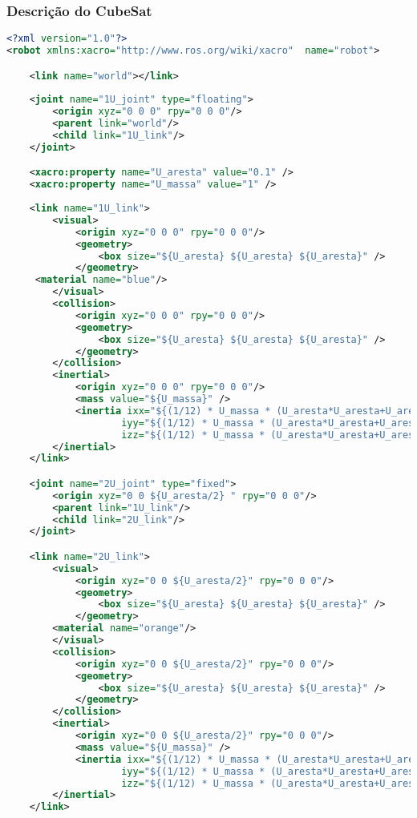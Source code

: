 \subsubsection{Descrição do CubeSat}

\begin{lstlisting}[language=XML,caption={XML version}]
<?xml version="1.0"?>
<robot xmlns:xacro="http://www.ros.org/wiki/xacro"  name="robot">

    <link name="world"></link>
    
    <joint name="1U_joint" type="floating">
    	<origin xyz="0 0 0" rpy="0 0 0"/>
    	<parent link="world"/>
    	<child link="1U_link"/>
    </joint>

    <xacro:property name="U_aresta" value="0.1" />
    <xacro:property name="U_massa" value="1" />
    
    <link name="1U_link">
        <visual>
            <origin xyz="0 0 0" rpy="0 0 0"/>
            <geometry>
                <box size="${U_aresta} ${U_aresta} ${U_aresta}" />
            </geometry>
	 <material name="blue"/>
        </visual>
        <collision>
            <origin xyz="0 0 0" rpy="0 0 0"/>
            <geometry>
                <box size="${U_aresta} ${U_aresta} ${U_aresta}" />
            </geometry>
        </collision>
        <inertial>
            <origin xyz="0 0 0" rpy="0 0 0"/>
            <mass value="${U_massa}" />
            <inertia ixx="${(1/12) * U_massa * (U_aresta*U_aresta+U_aresta*U_aresta)}" ixy="0.0" ixz="0.0"
                    iyy="${(1/12) * U_massa * (U_aresta*U_aresta+U_aresta*U_aresta)}" iyz="0.0"
                    izz="${(1/12) * U_massa * (U_aresta*U_aresta+U_aresta*U_aresta)}" />
        </inertial>
    </link>

    <joint name="2U_joint" type="fixed">
        <origin xyz="0 0 ${U_aresta/2} " rpy="0 0 0"/>
        <parent link="1U_link"/>
        <child link="2U_link"/>
    </joint>

    <link name="2U_link">
        <visual>
            <origin xyz="0 0 ${U_aresta/2}" rpy="0 0 0"/>
            <geometry>
                <box size="${U_aresta} ${U_aresta} ${U_aresta}" />
            </geometry>
		<material name="orange"/>
        </visual>
        <collision>
            <origin xyz="0 0 ${U_aresta/2}" rpy="0 0 0"/>
            <geometry>
                <box size="${U_aresta} ${U_aresta} ${U_aresta}" />
            </geometry>
        </collision>
        <inertial>
            <origin xyz="0 0 ${U_aresta/2}" rpy="0 0 0"/>
            <mass value="${U_massa}" />
            <inertia ixx="${(1/12) * U_massa * (U_aresta*U_aresta+U_aresta*U_aresta)}" ixy="0.0" ixz="0.0"
                    iyy="${(1/12) * U_massa * (U_aresta*U_aresta+U_aresta*U_aresta)}" iyz="0.0"
                    izz="${(1/12) * U_massa * (U_aresta*U_aresta+U_aresta*U_aresta)}" />
        </inertial>
    </link>
    

\end{lstlisting}
